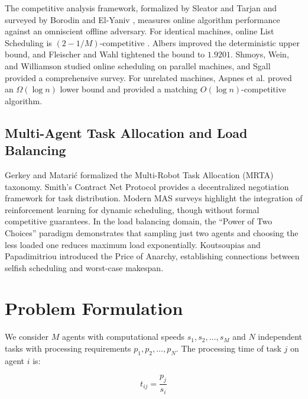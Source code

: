\documentclass[conference]{IEEEtran}
\begin{document}
The competitive analysis framework, formalized by Sleator and Tarjan \cite{sleator1985} and surveyed by Borodin and El-Yaniv \cite{borodin1998}, measures online algorithm performance against an omniscient offline adversary. For identical machines, online List Scheduling is $(2-1/M)$-competitive \cite{graham1966}. Albers \cite{albers1999} improved the deterministic upper bound, and Fleischer and Wahl \cite{fleischer2000} tightened the bound to $1.9201$. Shmoys, Wein, and Williamson \cite{shmoys1995} studied online scheduling on parallel machines, and Sgall \cite{sgall1998} provided a comprehensive survey. For unrelated machines, Aspnes et al. \cite{aspnes1997} proved an $\Omega(\log n)$ lower bound and provided a matching $O(\log n)$-competitive algorithm.

\subsection{Multi-Agent Task Allocation and Load Balancing}

Gerkey and Matari\'{c} \cite{gerkey2004} formalized the Multi-Robot Task Allocation (MRTA) taxonomy. Smith's Contract Net Protocol \cite{smith1980} provides a decentralized negotiation framework for task distribution. Modern MAS surveys \cite{dorri2018} highlight the integration of reinforcement learning for dynamic scheduling, though without formal competitive guarantees. In the load balancing domain, the ``Power of Two Choices'' paradigm \cite{azar1999, mitzenmacher2001} demonstrates that sampling just two agents and choosing the less loaded one reduces maximum load exponentially. Koutsoupias and Papadimitriou \cite{koutsoupias1999} introduced the Price of Anarchy, establishing connections between selfish scheduling and worst-case makespan.

\section{Problem Formulation}

We consider $M$ agents with computational speeds $s_1, s_2, \ldots, s_M$ and $N$ independent tasks with processing requirements $p_1, p_2, \ldots, p_N$. The processing time of task $j$ on agent $i$ is:

\begin{equation}
    t_{ij} = \frac{p_j}{s_i}
\end{equation}
\end{document}
